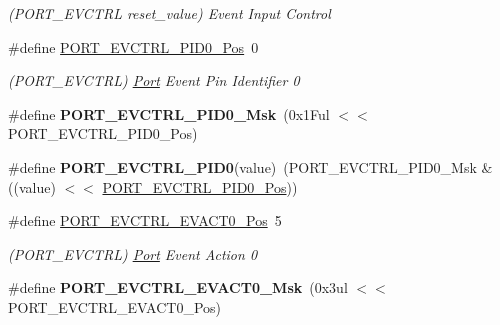 \begin{DoxyCompactItemize}
\begin{DoxyCompactList}\small\item\em (P\+O\+R\+T\+\_\+\+E\+V\+C\+T\+R\+L reset\+\_\+value) Event Input Control \end{DoxyCompactList}\item 
\hypertarget{group___s_a_m_l21___p_o_r_t_gac8c61aca87d2364723a79981619eaf1a}{}\#define \hyperlink{group___s_a_m_l21___p_o_r_t_gac8c61aca87d2364723a79981619eaf1a}{P\+O\+R\+T\+\_\+\+E\+V\+C\+T\+R\+L\+\_\+\+P\+I\+D0\+\_\+\+Pos}~0\label{group___s_a_m_l21___p_o_r_t_gac8c61aca87d2364723a79981619eaf1a}

\begin{DoxyCompactList}\small\item\em (P\+O\+R\+T\+\_\+\+E\+V\+C\+T\+R\+L) \hyperlink{struct_port}{Port} Event Pin Identifier 0 \end{DoxyCompactList}\item 
\hypertarget{group___s_a_m_l21___p_o_r_t_ga9f5dd7cc1ac27818bf89bca573e3628f}{}\#define {\bfseries P\+O\+R\+T\+\_\+\+E\+V\+C\+T\+R\+L\+\_\+\+P\+I\+D0\+\_\+\+Msk}~(0x1\+Ful $<$$<$ P\+O\+R\+T\+\_\+\+E\+V\+C\+T\+R\+L\+\_\+\+P\+I\+D0\+\_\+\+Pos)\label{group___s_a_m_l21___p_o_r_t_ga9f5dd7cc1ac27818bf89bca573e3628f}

\item 
\hypertarget{group___s_a_m_l21___p_o_r_t_ga4e0802570146dc274edd36042d129465}{}\#define {\bfseries P\+O\+R\+T\+\_\+\+E\+V\+C\+T\+R\+L\+\_\+\+P\+I\+D0}(value)~(P\+O\+R\+T\+\_\+\+E\+V\+C\+T\+R\+L\+\_\+\+P\+I\+D0\+\_\+\+Msk \& ((value) $<$$<$ \hyperlink{group___s_a_m_l21___p_o_r_t_gac8c61aca87d2364723a79981619eaf1a}{P\+O\+R\+T\+\_\+\+E\+V\+C\+T\+R\+L\+\_\+\+P\+I\+D0\+\_\+\+Pos}))\label{group___s_a_m_l21___p_o_r_t_ga4e0802570146dc274edd36042d129465}

\item 
\hypertarget{group___s_a_m_l21___p_o_r_t_ga34e976f20ab7a82c517be8a4e6fe3ac8}{}\#define \hyperlink{group___s_a_m_l21___p_o_r_t_ga34e976f20ab7a82c517be8a4e6fe3ac8}{P\+O\+R\+T\+\_\+\+E\+V\+C\+T\+R\+L\+\_\+\+E\+V\+A\+C\+T0\+\_\+\+Pos}~5\label{group___s_a_m_l21___p_o_r_t_ga34e976f20ab7a82c517be8a4e6fe3ac8}

\begin{DoxyCompactList}\small\item\em (P\+O\+R\+T\+\_\+\+E\+V\+C\+T\+R\+L) \hyperlink{struct_port}{Port} Event Action 0 \end{DoxyCompactList}\item 
\hypertarget{group___s_a_m_l21___p_o_r_t_gadff49d26858729eb64dd70dc1422491b}{}\#define {\bfseries P\+O\+R\+T\+\_\+\+E\+V\+C\+T\+R\+L\+\_\+\+E\+V\+A\+C\+T0\+\_\+\+Msk}~(0x3ul $<$$<$ P\+O\+R\+T\+\_\+\+E\+V\+C\+T\+R\+L\+\_\+\+E\+V\+A\+C\+T0\+\_\+\+Pos)\label{group___s_a_m_l21___p_o_r_t_gadff49d26858729eb64dd70dc1422491b}


\end{DoxyCompactItemize}
